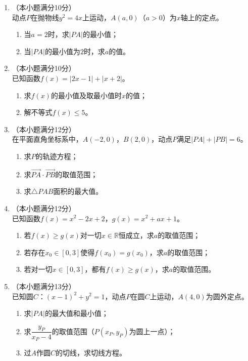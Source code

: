 \documentclass[12pt, a4paper]{ctexart}
\begin{document}
\begin{enumerate}[resume]

\item （本小题满分10分）\\
动点$P$在抛物线$y^2=4x$上运动，$A(a,0)$（$a>0$）为$x$轴上的定点。
\begin{enumerate}[(1)]
\item 当$a=2$时，求$|PA|$的最小值；
\item 当$|PA|$的最小值为$2$时，求$a$的值。
\end{enumerate}

\item （本小题满分10分）\\
已知函数$f(x)=|2x-1|+|x+2|$。
\begin{enumerate}[(1)]
\item 求$f(x)$的最小值及取最小值时$x$的值；
\item 解不等式$f(x)\leq 5$。
\end{enumerate}

\item （本小题满分12分）\\
在平面直角坐标系中，$A(-2,0)$，$B(2,0)$，动点$P$满足$|PA|+|PB|=6$。
\begin{enumerate}[(1)]
\item 求$P$的轨迹方程；
\item 求$\overrightarrow{PA}\cdot\overrightarrow{PB}$的取值范围；
\item 求$\triangle PAB$面积的最大值。
\end{enumerate}

\item （本小题满分12分）\\
已知函数$f(x)=x^2-2x+2$，$g(x)=x^2+ax+1$。
\begin{enumerate}[(1)]
\item 若$f(x)\geq g(x)$对一切$x\in\mathbb{R}$恒成立，求$a$的取值范围；
\item 若存在$x_0\in[0,3]$使得$f(x_0)=g(x_0)$，求$a$的取值范围；
\item 若对一切$x\in[0,3]$，都有$f(x)\geq g(x)$，求$a$的取值范围。
\end{enumerate}

\item （本小题满分13分）\\
已知圆$C$：$(x-1)^2+y^2=1$，动点$P$在圆$C$上运动，$A(4,0)$为圆外定点。
\begin{enumerate}[(1)]
\item 求$|PA|$的最大值和最小值；
\item 求$\dfrac{y_P}{x_P-4}$的取值范围（$P(x_P,y_P)$为圆上一点）；
\item 过$A$作圆$C$的切线，求切线方程。
\end{enumerate}


\end{enumerate}
\end{document}
